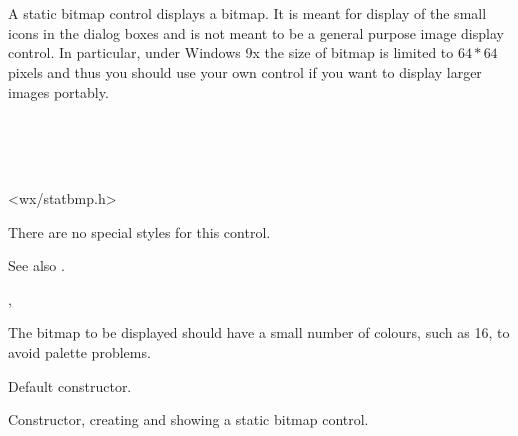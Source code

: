 \section{}\label{wxstaticbitmap}

A static bitmap control displays a bitmap. It is meant for display of the
small icons in the dialog boxes and is not meant to be a general purpose image
display control. In particular, under Windows 9x the size of bitmap is limited
to $64*64$ pixels and thus you should use your own control if you want to
display larger images portably.


\\
\\
\\


<wx/statbmp.h>


There are no special styles for this control.

See also .


, 


The bitmap to be displayed should have a small number of colours, such as 16, to avoid
palette problems.



\label{wxstaticbitmapconstr}


Default constructor.


Constructor, creating and showing a static bitmap control.



